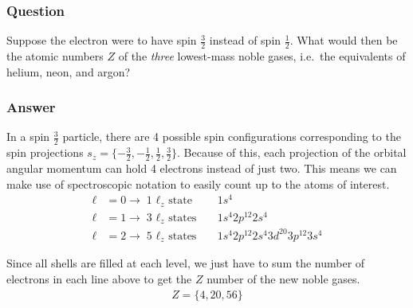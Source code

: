\subsubsection{Question}

Suppose the electron were to have spin $\frac 32$ instead of spin $\frac 12$.
What would then be the atomic numbers $Z$ of the \emph{three} lowest-mass
noble gases, i.e.~the equivalents of helium, neon, and argon?

\subsubsection{Answer}

In a spin $\frac 32$ particle, there are 4 possible spin configurations
corresponding to the spin projections $s_z = \{ -\frac 32, -\frac 12, \frac 12,
\frac 32\}$. Because of this, each projection of the orbital angular momentum
can hold 4 electrons instead of just two. This means we can make use of
spectroscopic notation to easily count up to the atoms of interest.
\begin{align*}
    \ell  &= 0 \rightarrow  \text{1 $\ell_z$ state}	& & 1{s^4} \\
    \ell  &= 1 \rightarrow  \text{3 $\ell_z$ states} & & 1{s^4}2{p^{12}}2s^4 \\
    \ell  &= 2 \rightarrow  \text{5 $\ell_z$ states} & & 1{s^4}2{p^{12}}2{s^4}3d^{20}3{p^{12}}3s^4
\end{align*}

Since all shells are filled at each level, we just have to sum the number of
electrons in each line above to get the $Z$ number of the new noble gases.
\begin{align}
    \boxed{ Z = \{4, 20, 56 \} }
\end{align}
